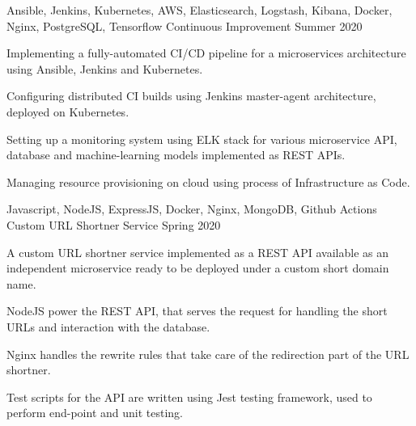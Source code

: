 \begin{cventries}
  \cventry
    {Ansible, Jenkins, Kubernetes, AWS, Elasticsearch, Logstash, Kibana, Docker, Nginx, PostgreSQL, Tensorflow} %
    {Continuous Improvement} %
    {} %
    {Summer 2020} %
    {
      \begin{cvitems} %
        \item {Implementing a fully-automated CI/CD pipeline for a microservices architecture using Ansible, Jenkins and Kubernetes.}
        \item {Configuring distributed CI builds using Jenkins master-agent architecture, deployed on Kubernetes.}
        \item {Setting up a monitoring system using ELK stack for various microservice API, database and machine-learning models implemented as REST APIs.}
        \item {Managing resource provisioning on cloud using process of Infrastructure as Code.}
      \end{cvitems}
    }

  \cventry
    {Javascript, NodeJS, ExpressJS, Docker, Nginx, MongoDB, Github Actions} %
    {Custom URL Shortner Service} %
    {} %
    {Spring 2020} %
    {
      \begin{cvitems} %
        \item {A custom URL shortner service implemented as a REST API available as an independent microservice ready to be deployed under a custom short domain name.}
        \item {NodeJS power the REST API, that serves the request for handling the short URLs and interaction with the database.}
        \item {Nginx handles the rewrite rules that take care of the redirection part of the URL shortner.}
        \item {Test scripts for the API are written using Jest testing framework, used to perform end-point and unit testing.}
      \end{cvitems}
    }


\end{cventries}
